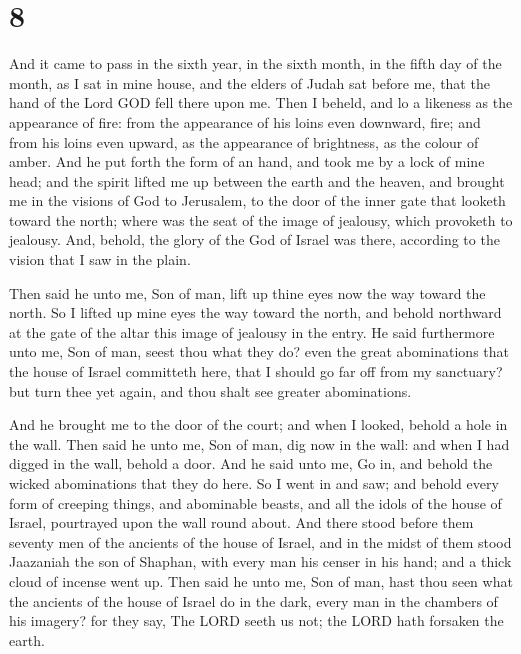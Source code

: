 \hypertarget{section-7}{%
\section{8}\label{section-7}}

 And it came to pass in the sixth year, in the sixth
month, in the fifth day of the month, as I sat in mine house, and the
elders of Judah sat before me, that the hand of the Lord GOD fell there
upon me.  Then I beheld, and lo a likeness as the
appearance of fire: from the appearance of his loins even downward,
fire; and from his loins even upward, as the appearance of brightness,
as the colour of amber.  And he put forth the form of an
hand, and took me by a lock of mine head; and the spirit lifted me up
between the earth and the heaven, and brought me in the visions of God
to Jerusalem, to the door of the inner gate that looketh toward the
north; where was the seat of the image of jealousy, which provoketh to
jealousy.  And, behold, the glory of the God of Israel was
there, according to the vision that I saw in the plain.

 Then said he unto me, Son of man, lift up thine eyes now
the way toward the north. So I lifted up mine eyes the way toward the
north, and behold northward at the gate of the altar this image of
jealousy in the entry.  He said furthermore unto me, Son
of man, seest thou what they do? even the great abominations that the
house of Israel committeth here, that I should go far off from my
sanctuary? but turn thee yet again, and thou shalt see greater
abominations.

 And he brought me to the door of the court; and when I
looked, behold a hole in the wall.  Then said he unto me,
Son of man, dig now in the wall: and when I had digged in the wall,
behold a door.  And he said unto me, Go in, and behold the
wicked abominations that they do here.  So I went in and
saw; and behold every form of creeping things, and abominable beasts,
and all the idols of the house of Israel, pourtrayed upon the wall round
about.  And there stood before them seventy men of the
ancients of the house of Israel, and in the midst of them stood
Jaazaniah the son of Shaphan, with every man his censer in his hand; and
a thick cloud of incense went up.  Then said he unto me,
Son of man, hast thou seen what the ancients of the house of Israel do
in the dark, every man in the chambers of his imagery? for they say, The
LORD seeth us not; the LORD hath forsaken the earth.

